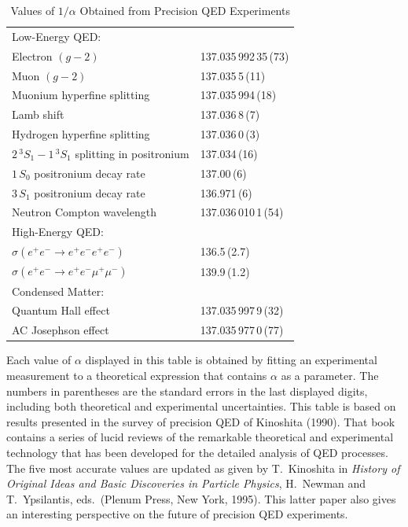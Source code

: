 \begin{table}[t]
  \centering
  \caption{Values of $1/\alpha$ Obtained from Precision QED Experiments}
  \begin{tabular}{ll}
    \toprule
    Low-Energy QED: & \\
    Electron $(g-2)$ & 137.035\,992\,35\,(73)\\
    Muon $(g-2)$ & 137.035\,5\,(11)\\
    Muonium hyperfine splitting & 137.035\,994\,(18)\\
    Lamb shift & 137.036\,8\,(7)\\
    Hydrogen hyperfine splitting & 137.036\,0\,(3)\\
    $2\,^3S_1 - 1\,^3S_1$ splitting in positronium & 137.034\,(16)\\
    $1\,S_0$ positronium decay rate & 137.00\,(6)\\
    $3\,S_1$ positronium decay rate & 136.971\,(6)\\
    Neutron Compton wavelength & 137.036\,010\,1\,(54)\\
    \midrule
    High-Energy QED: & \\
    $\sigma(e^{+}e^{-}\to e^{+}e^{-}e^{+}e^{-})$ & 136.5\,(2.7)\\
    $\sigma(e^{+}e^{-}\to e^{+}e^{-}\mu^{+}\mu^{-})$ & 139.9\,(1.2)\\
    \midrule
    Condensed Matter: & \\
    Quantum Hall effect & 137.035\,997\,9\,(32)\\
    AC Josephson effect & 137.035\,977\,0\,(77)\\
    \bottomrule
  \end{tabular}
  \label{tab:6.1}
\end{table}

Each value of $\alpha$ displayed in this table is obtained by fitting an
experimental measurement to a theoretical expression that contains $\alpha$ as
a parameter.  The numbers in parentheses are the standard errors in the last
displayed digits, including both theoretical and experimental uncertainties.
This table is based on results presented in the survey of precision QED of
Kinoshita (1990).  That book contains a series of lucid reviews of the
remarkable theoretical and experimental technology that has been developed
for the detailed analysis of QED processes.  The five most accurate values are
updated as given by T.~Kinoshita in \emph{History of Original Ideas and Basic
Discoveries in Particle Physics}, H.~Newman and T.~Ypsilantis, eds.\ (Plenum
Press, New York, 1995).  This latter paper also gives an interesting
perspective on the future of precision QED experiments.

